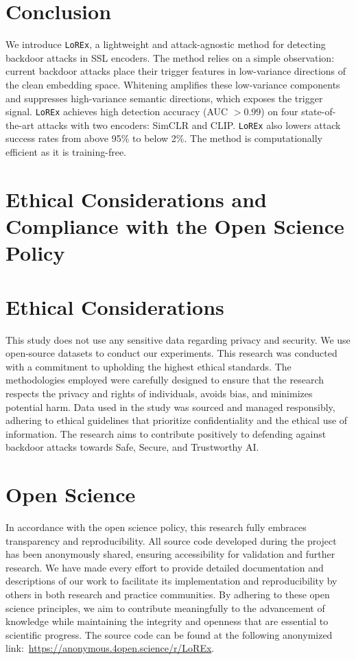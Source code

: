 \documentclass[letterpaper,twocolumn,10pt]{article}
\begin{document}
\section{Conclusion}
\label{Section9}
We introduce \texttt{LoREx}, a lightweight and attack-agnostic method for detecting backdoor attacks in SSL encoders. The method relies on a simple observation: current backdoor attacks place their trigger features in low-variance directions of the clean embedding space. Whitening amplifies these low-variance components and suppresses high-variance semantic directions, which exposes the trigger signal. \texttt{LoREx} achieves high detection accuracy (AUC $>0.99$) on four state-of-the-art attacks with two encoders: SimCLR and CLIP. \texttt{LoREx} also lowers attack success rates from above 95\% to below 2\%. The method is computationally efficient as it is training-free.

 
\section*{Ethical Considerations and Compliance with the Open Science Policy}

\section*{Ethical Considerations}
\par This study does not use any sensitive data regarding privacy and security. We use open-source datasets to conduct our experiments. This research was conducted with a commitment to upholding the highest ethical standards. The methodologies employed were carefully designed to ensure that the research respects the privacy and rights of individuals, avoids bias, and minimizes potential harm. Data used in the study was sourced and managed responsibly, adhering to ethical guidelines that prioritize confidentiality and the ethical use of information. The research aims to contribute positively to defending against backdoor attacks towards Safe, Secure, and Trustworthy AI. 

\section*{Open Science}
\par In accordance with the open science policy, this research fully embraces transparency and reproducibility. All source code developed during the project has been anonymously shared, ensuring accessibility for validation and further research. We have made every effort to provide detailed documentation and descriptions of our work to facilitate its implementation and reproducibility by others in both research and practice communities. By adhering to these open science principles, we aim to contribute meaningfully to the advancement of knowledge while maintaining the integrity and openness that are essential to scientific progress. The source code can be found at the following anonymized link:~\url{https://anonymous.4open.science/r/LoREx}.
\end{document}
